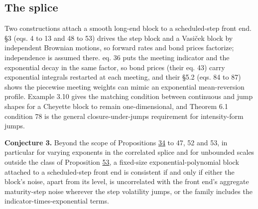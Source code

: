 \documentclass[11pt]{article}
\begin{document}
\subsection{The splice}\label{sec:5.5}

Two constructions attach a smooth long-end block to a scheduled-step front end. \cite{gellert2021short} §3 (eqs. 4 to 13 and 48 to 53) drives the step block and a Vasiček block by independent Brownian motions, so forward rates and bond prices factorize; independence is assumed there. \cite{brace2024sofr} eq. 36 puts the meeting indicator and the exponential decay in the same factor, so bond prices (their eq. 43) carry exponential integrals restarted at each meeting, and their §5.2 (eqs. 84 to 87) shows the piecewise meeting weights can mimic an exponential mean-reversion profile. \cite{fontana2022term} Example 3.10 gives the matching condition between continuous and jump shapes for a Cheyette block to remain one-dimensional, and \cite{bjork1999interest} Theorem 6.1 condition 78 is the general closure-under-jumps requirement for intensity-form jumps.

\textbf{Conjecture 3.} Beyond the scope of Propositions \hyperref[res:Proposition-34]{34} to 47, 52 and 53, in particular for varying exponents in the correlated splice and for unbounded scales outside the class of Proposition \hyperref[res:Proposition-53]{53}, a fixed-size exponential-polynomial block attached to a scheduled-step front end is consistent if and only if either the block's noise, apart from its level, is uncorrelated with the front end's aggregate maturity-step noise wherever the step volatility jumps, or the family includes the indicator-times-exponential terms.
\end{document}
